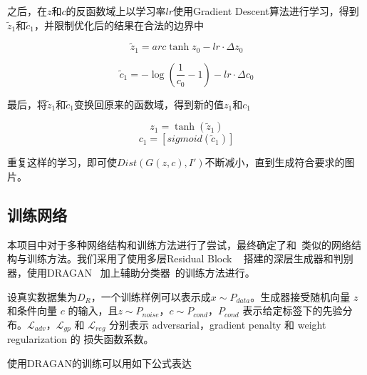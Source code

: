\documentclass[a4paper,12pt,UTF8]{ctexart}
\begin{document}
之后，在$z$和$c$的反函数域上以学习率$lr$使用Gradient Descent算法进行学习，得到$\tilde z_{1}$和$\tilde c_{1}$，并限制优化后的结果在合法的边界中

\begin{equation}
  \tilde z_{1} = arc \tanh z_{0} - lr \cdot \Delta z_{0}
\end{equation}

\begin{equation}
  \tilde c_{1} = - \log (\frac{1}{c_{0}} - 1) - lr \cdot \Delta c_{0}
\end{equation}

最后，将$\tilde z_{1}$和$\tilde c_{1}$变换回原来的函数域，得到新的值$z_{1}$和$c_{1}$

\begin{equation}
  z_{1} = \tanh (\tilde z_{1})
\end{equation}
\begin{equation}
  c_{1} = [ sigmoid(\tilde c_{1}) ]
\end{equation}

重复这样的学习，即可使$Dist(G(z, c), I')$不断减小，直到生成符合要求的图片。


\subsection{训练网络}

本项目中对于多种网络结构和训练方法进行了尝试，最终确定了和~\cite{Jin2017Towards}类似的网络结构与训练方法。我们采用了使用多层Residual Block ~\cite{he2016deep} 搭建的深层生成器和判别器，使用DRAGAN ~\cite{kodali2017convergence}加上辅助分类器~\cite{odena2016conditional}的训练方法进行。

设真实数据集为$D_R$，一个训练样例可以表示成$x \sim P_{data}$。生成器接受随机向量 $z$ 和条件向量 $c$ 的输入，且$z \sim P_{noise}$，$c \sim P_{cond}$，$P_{cond}$ 表示给定标签下的先验分布。$\mathcal{L}_{adv}$，$\mathcal{L}_{gp}$ 和 $\mathcal{L}_{reg}$ 分别表示 adversarial，gradient penalty 和 weight regularization 的 损失函数系数。

使用DRAGAN的训练可以用如下公式表达
\end{document}
